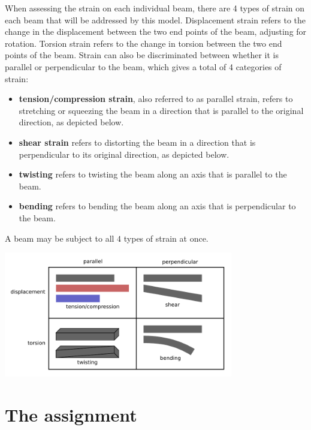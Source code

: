 \documentclass{article}
\begin{document}
When assessing the strain on each individual beam, there are 4 types of strain on each beam that will be addressed by this model. Displacement strain refers to the change in the displacement between the two end points of the beam, adjusting for rotation. Torsion strain refers to the change in torsion between the two end points of the beam. Strain can also be discriminated between whether it is parallel or perpendicular to the beam, which gives a total of 4 categories of strain: 
\begin{itemize}
\item \textbf{tension/compression strain}, also referred to as parallel strain, refers to stretching or squeezing the beam in a direction that is parallel to the original direction, as depicted below. 
\item \textbf{shear strain} refers to distorting the beam in a direction that is perpendicular to its original direction, as depicted below.
\item \textbf{twisting} refers to twisting the beam along an axis that is parallel to the beam.
\item \textbf{bending} refers to bending the beam along an axis that is perpendicular to the beam.  
\end{itemize}
A beam may be subject to all \(4\) types of strain at once.

\begin{center}
\includegraphics[width = 0.75\textwidth]{_4_types_of_strain}
\end{center}









\section{The assignment}
\end{document}
